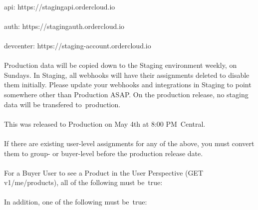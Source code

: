 \documentclass{memoir}%
\begin{document}
\paragraph*{}%
api: https://stagingapi.ordercloud.io

%
\paragraph*{}%
auth: https://stagingauth.ordercloud.io

%
\paragraph*{}%
devcenter: https://staging{-}account.ordercloud.io

%
\paragraph*{}%
Production data will be copied down to the Staging environment weekly, on Sundays. In Staging, all webhooks will have their assignments deleted to disable them initially. Please update your webhooks and integrations in Staging to point somewhere other than Production ASAP. On the production release, no staging data will be transfered to~production.

%
\paragraph*{}%
This was released to Production on May 4th at 8:00 PM~Central. 

%
\paragraph*{}%
If there are existing user{-}level assignments for any of the above, you must convert them to group{-} or buyer{-}level before the production release date.

%
\paragraph*{}%
For a Buyer User to see a Product in the User Perspective (GET v1/me/products), all of the following must be~true:

%
\paragraph*{}%
In addition, one of the following must be~true:
\end{document}

